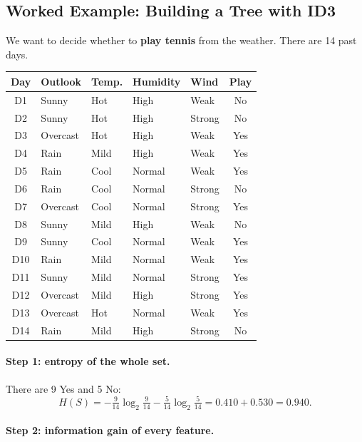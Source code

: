\subsection{Worked Example: Building a Tree with ID3}

We want to decide whether to \textbf{play tennis} from the weather. There are 14 past days.

\begin{center}
\small
\begin{tabular}{@{}cllllc@{}}
\toprule
\textbf{Day} & \textbf{Outlook} & \textbf{Temp.} & \textbf{Humidity} & \textbf{Wind} & \textbf{Play}\\
\midrule
D1 & Sunny & Hot & High & Weak & No\\
D2 & Sunny & Hot & High & Strong & No\\
D3 & Overcast & Hot & High & Weak & Yes\\
D4 & Rain & Mild & High & Weak & Yes\\
D5 & Rain & Cool & Normal & Weak & Yes\\
D6 & Rain & Cool & Normal & Strong & No\\
D7 & Overcast & Cool & Normal & Strong & Yes\\
D8 & Sunny & Mild & High & Weak & No\\
D9 & Sunny & Cool & Normal & Weak & Yes\\
D10 & Rain & Mild & Normal & Weak & Yes\\
D11 & Sunny & Mild & Normal & Strong & Yes\\
D12 & Overcast & Mild & High & Strong & Yes\\
D13 & Overcast & Hot & Normal & Weak & Yes\\
D14 & Rain & Mild & High & Strong & No\\
\bottomrule
\end{tabular}
\end{center}

\paragraph{Step 1: entropy of the whole set.} There are 9 Yes and 5 No:
\[
H(S)=-\tfrac{9}{14}\log_2\tfrac{9}{14}-\tfrac{5}{14}\log_2\tfrac{5}{14}=0.410+0.530=\mathbf{0.940}.
\]

\paragraph{Step 2: information gain of every feature.}

